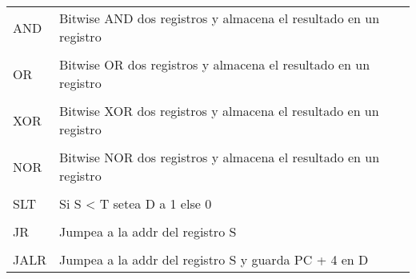 \documentclass[11pt]{article}
\begin{document}
\begin{enumerate}
\begin{center}
{\begin{tabular}{l p{10cm}}
AND         & Bitwise AND dos registros y almacena el resultado en un registro\\ \\
OR          & Bitwise OR dos registros y almacena el resultado en un registro\\ \\
XOR         & Bitwise XOR dos registros y almacena el resultado en un registro\\ \\
NOR         & Bitwise NOR dos registros y almacena el resultado en un registro\\ \\
SLT         & Si S < T setea D a 1 else 0\\ \\
JR          & Jumpea a la addr del registro S\\ \\
JALR        & Jumpea a la addr del registro S y guarda PC + 4 en D\\
\end{tabular}
}
\end{center}


\end{enumerate}
\end{document}
